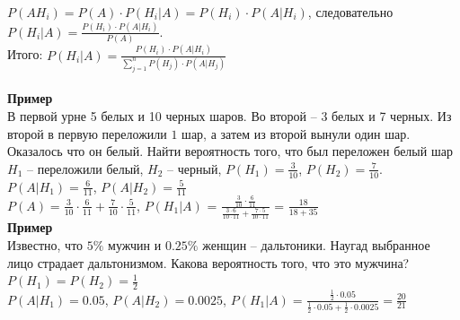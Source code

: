 \documentclass[russian, 12pt, fleqn]{article}
\begin{document}
$P(AH_i)=P(A)\cdot P(H_i|A) = P(H_i) \cdot P(A|H_i)$, следовательно $P(H_i|A) = \frac{P(H_i) \cdot P(A|H_i)}{P(A)}$.\\
Итого: $P(H_i|A) = \frac{P(H_i)\cdot P(A|H_i)}{ \sum\limits_{j=1}^{n}P(H_j)\cdot P(A|H_j) }$\\
\\
\textbf{Пример\ }\\
В первой урне 5 белых и 10 черных шаров. Во второй -- 3 белых и 7 черных. Из второй в первую переложили $1$ шар, а затем из второй вынули один шар. Оказалось что он белый. Найти вероятность того, что был переложен белый шар\\
$H_1$ -- переложили белый, $H_2$ -- черный, $P(H_1)=\frac{3}{10}$, $P(H_2)=\frac{7}{10}$. $P(A|H_1)=\frac{6}{11}$, $P(A|H_2)=\frac{5}{11}$\\
 $P(A)=\frac{3}{10}\cdot \frac{6}{11} + \frac{7}{10} \cdot \frac{5}{11}$, $P(H_1|A)$ = $\frac {\frac{3}{10}\cdot \frac{6}{11} }   {\frac{3\cdot 6}{10\cdot11} + \frac{7\cdot5}{10\cdot11}  }$ = $\frac{18}{18 + 35}$\\
\textbf{Пример\ }\\
Известно, что $5\%$ мужчин и $0.25\%$ женщин -- дальтоники. Наугад выбранное лицо страдает дальтонизмом. Какова вероятность того, что это мужчина?\\
$P(H_1) = P(H_2) = \frac{1}{2}$\\
$P(A|H_1) = 0.05$, $P(A|H_2) = 0.0025$, $P(H_1|A) = \frac{\frac{1}{2} \cdot 0.05}{ \frac{1}{2} \cdot 0.05 + \frac{1}{2} \cdot 0.0025 } = \frac{20}{21}$\\
\end{document}
